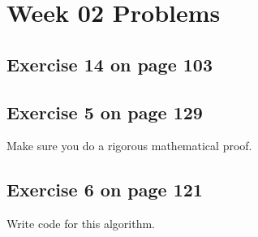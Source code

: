 \documentclass[12pt]{amsart}
\begin{document}
\section{Week 02 Problems}
\subsection{Exercise 14 on page 103} 
\subsection{Exercise 5 on page 129} Make sure you do a rigorous mathematical proof.
\subsection{Exercise 6 on page 121} Write code for this algorithm.
\end{document}
